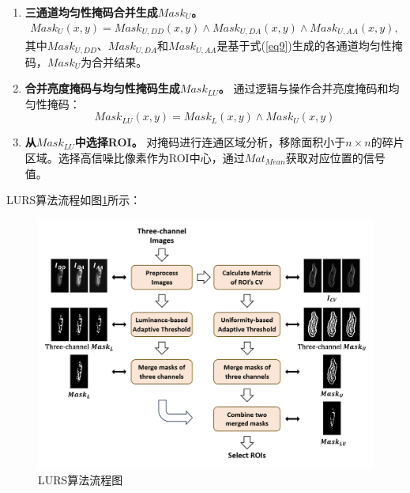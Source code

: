 \begin{enumerate}
\item \textbf{三通道均匀性掩码合并生成${Mask}_U$。}  
\begin{equation}
    \begin{split}
    {Mask}_{U}(x,y)={Mask}_{U,DD}(x,y) \land {Mask}_{U,DA}(x,y) \land {Mask}_{U,AA}(x,y),
    \end{split}
    \label{eq_merge_u}
\end{equation}
其中${Mask}_{U,DD}$、${Mask}_{U,DA}$和${Mask}_{U,AA}$是基于式(\ref{eq9})生成的各通道均匀性掩码，${Mask}_{U}$为合并结果。

\item \textbf{合并亮度掩码与均匀性掩码生成${Mask}_{LU}$。}  
通过逻辑与操作合并亮度掩码和均匀性掩码：
\begin{equation}
    {Mask}_{LU}(x,y)={Mask}_L(x,y) \land {Mask}_U(x,y)
    \label{eq10}
\end{equation}

\item \textbf{从${Mask}_{LU}$中选择ROI。}  
对掩码进行连通区域分析，移除面积小于$n \times n$的碎片区域。选择高信噪比像素作为ROI中心，通过${Mat}_{Mean}$获取对应位置的信号值。
\end{enumerate}

LURS算法流程如图\ref{fig1}所示：

\begin{figure}[!htbp]
\centering
\includegraphics[width=1\linewidth]{../figures/3/3_LURS流程图.png}
\caption{LURS算法流程图}\label{fig1}
\end{figure}

